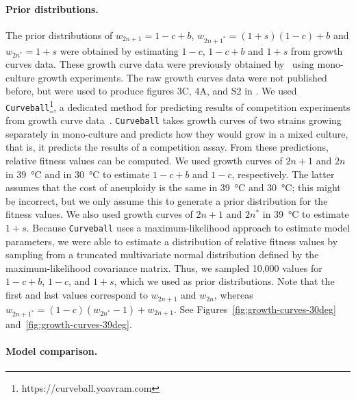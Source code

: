\documentclass[12pt]{extarticle}
\begin{document}
\paragraph{Prior distributions.} The prior distributions of $w_{2n+1}=1-c+b$, $w_{2n+1^*}=(1+s)(1-c)+b$ and $w_{2n^*}=1+s$ were obtained by estimating $1-c$, $1-c+b$ and $1+s$ from growth curves data. These growth curve data were previously obtained by~\citet{Yona2012} using mono-culture growth experiments.
The raw growth curves data were not published before, but were used to produce figures 3C, 4A, and S2 in \citet{Yona2012}.
We used \texttt{Curveball}\footnote{https://curveball.yoavram.com}, a dedicated method for predicting results of competition experiments from growth curve data~\citep{Ram2019}. \texttt{Curveball} takes growth curves of two strains growing separately in mono-culture and predicts how they would grow in a mixed culture, that is, it predicts the results of a competition assay.
From these predictions, relative fitness values can be computed.  
We used growth curves of $2n+1$ and $2n$ in \SI{39}{\celsius} and in \SI{30}{\celsius} to estimate $1-c+b$ and $1-c$, respectively. The latter assumes that the cost of aneuploidy is the same in \SI{39}{\celsius} and \SI{30}{\celsius}; this might be incorrect, but we only assume this to generate a prior distribution for the fitness values. We also used growth curves of $2n+1$ and $2n^*$ in \SI{39}{\celsius} to estimate $1+s$. 
Because \texttt{Curveball} uses a maximum-likelihood approach to estimate model parameters, we were able to estimate a distribution of relative fitness values by sampling from a truncated multivariate normal distribution defined by the maximum-likelihood covariance matrix. Thus, we sampled 10,000 values for $1-c+b$, $1-c$, and $1+s$, which we used as prior distributions. Note that the first and last values correspond to $w_{2n+1}$ and $w_{2n}$, whereas $w_{2n+1^*}=(1-c)(w_{2n^*}-1)+w_{2n+1}$.
See Figures~\ref{fig:growth-curves-30deg} and~\ref{fig:growth-curves-39deg}.

\paragraph{Model comparison.}  %
\end{document}
